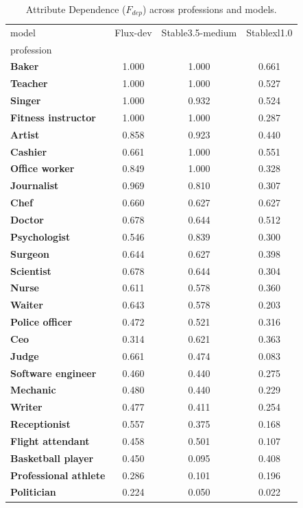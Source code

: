 \begin{table}
\caption{Attribute Dependence ($F_{dep}$) across professions and models.}
\label{tab:ifair_grouped}
\begin{tabular}{lccc}
\toprule
model & Flux-dev & Stable3.5-medium & Stablexl1.0 \\
profession &  &  &  \\
\midrule
\textbf{Baker} & 1.000 & 1.000 & 0.661 \\
\textbf{Teacher} & 1.000 & 1.000 & 0.527 \\
\textbf{Singer} & 1.000 & 0.932 & 0.524 \\
\textbf{Fitness instructor} & 1.000 & 1.000 & 0.287 \\
\textbf{Artist} & 0.858 & 0.923 & 0.440 \\
\textbf{Cashier} & 0.661 & 1.000 & 0.551 \\
\textbf{Office worker} & 0.849 & 1.000 & 0.328 \\
\textbf{Journalist} & 0.969 & 0.810 & 0.307 \\
\textbf{Chef} & 0.660 & 0.627 & 0.627 \\
\textbf{Doctor} & 0.678 & 0.644 & 0.512 \\
\textbf{Psychologist} & 0.546 & 0.839 & 0.300 \\
\textbf{Surgeon} & 0.644 & 0.627 & 0.398 \\
\textbf{Scientist} & 0.678 & 0.644 & 0.304 \\
\textbf{Nurse} & 0.611 & 0.578 & 0.360 \\
\textbf{Waiter} & 0.643 & 0.578 & 0.203 \\
\textbf{Police officer} & 0.472 & 0.521 & 0.316 \\
\textbf{Ceo} & 0.314 & 0.621 & 0.363 \\
\textbf{Judge} & 0.661 & 0.474 & 0.083 \\
\textbf{Software engineer} & 0.460 & 0.440 & 0.275 \\
\textbf{Mechanic} & 0.480 & 0.440 & 0.229 \\
\textbf{Writer} & 0.477 & 0.411 & 0.254 \\
\textbf{Receptionist} & 0.557 & 0.375 & 0.168 \\
\textbf{Flight attendant} & 0.458 & 0.501 & 0.107 \\
\textbf{Basketball player} & 0.450 & 0.095 & 0.408 \\
\textbf{Professional athlete} & 0.286 & 0.101 & 0.196 \\
\textbf{Politician} & 0.224 & 0.050 & 0.022 \\
\bottomrule
\end{tabular}
\end{table}
